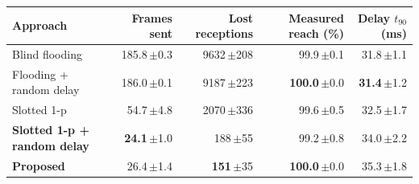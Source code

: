 \renewcommand{\arraystretch}{1.0}
\setlength{\tabcolsep}{3.5pt}
\begin{tabular}{@{}lrrrr@{}}
\toprule
\textbf{Approach} & \textbf{Frames sent} & \textbf{Lost receptions} & \textbf{Measured reach (\%)} &\textbf{Delay $t_{90}$ (ms)} \\
\midrule
Blind flooding & 185.8{\scriptsize\color{inkGray}\,$\pm$0.3} & 9632{\scriptsize\color{inkGray}\,$\pm$208} & 99.9{\scriptsize\color{inkGray}\,$\pm$0.1} & 31.8{\scriptsize\color{inkGray}\,$\pm$1.1} \\
Flooding + random delay & 186.0{\scriptsize\color{inkGray}\,$\pm$0.1} & 9187{\scriptsize\color{inkGray}\,$\pm$223} & \textbf{100.0}{\scriptsize\color{inkGray}\,$\pm$0.0} & \textbf{31.4}{\scriptsize\color{inkGray}\,$\pm$1.2} \\
Slotted 1-p & 54.7{\scriptsize\color{inkGray}\,$\pm$4.8} & 2070{\scriptsize\color{inkGray}\,$\pm$336} & 99.6{\scriptsize\color{inkGray}\,$\pm$0.5} & 32.5{\scriptsize\color{inkGray}\,$\pm$1.7} \\
\rowcolor{rowBase}\textbf{Slotted 1-p + random delay} & \textbf{24.1}{\scriptsize\color{inkGray}\,$\pm$1.0} & 188{\scriptsize\color{inkGray}\,$\pm$55} & 99.2{\scriptsize\color{inkGray}\,$\pm$0.8} & 34.0{\scriptsize\color{inkGray}\,$\pm$2.2} \\
\rowcolor{rowProp}\textbf{Proposed} & 26.4{\scriptsize\color{inkGray}\,$\pm$1.4} & \textbf{151}{\scriptsize\color{inkGray}\,$\pm$35} & \textbf{100.0}{\scriptsize\color{inkGray}\,$\pm$0.0} & 35.3{\scriptsize\color{inkGray}\,$\pm$1.8} \\
\bottomrule
\end{tabular}
